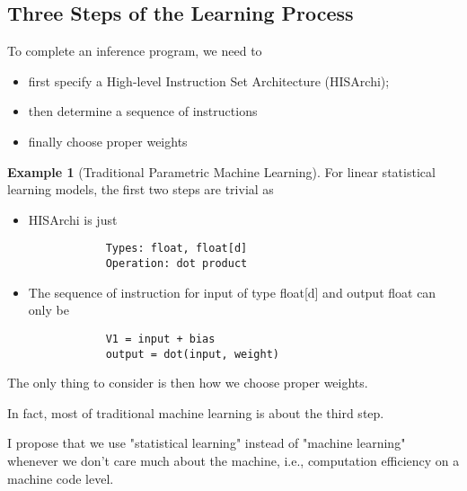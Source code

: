 \documentclass[10pt, oneside]{article}   	%
\theoremstyle{definition}
\newtheorem*{eg}{Example}
\begin{document}
\subsection{Three Steps of the Learning Process}
To complete an inference program, we need to
\begin{itemize}
	\item first specify a High-level Instruction Set Architecture (HISArchi);
	\item then determine a sequence of instructions
	\item finally choose proper weights
\end{itemize}
\begin{eg}[Traditional Parametric Machine Learning]
	For linear statistical learning models, the first two steps are trivial as
	\begin{itemize}
		\item HISArchi is just
		\begin{verbatim}
			Types: float, float[d]
			Operation: dot product
		\end{verbatim}
		\item The sequence of instruction for input of type float[d] and output float can only be
		\begin{verbatim}
			V1 = input + bias
			output = dot(input, weight)
		\end{verbatim}
	\end{itemize}

	The only thing to consider is then how we choose proper weights.

	In fact, most of traditional machine learning is about the third step.
\end{eg}
\begin{rmk}
	I propose that we use "statistical learning" instead of "machine learning" whenever we don't care much about the machine, i.e., computation efficiency on a machine code level.
\end{rmk}
\end{document}

